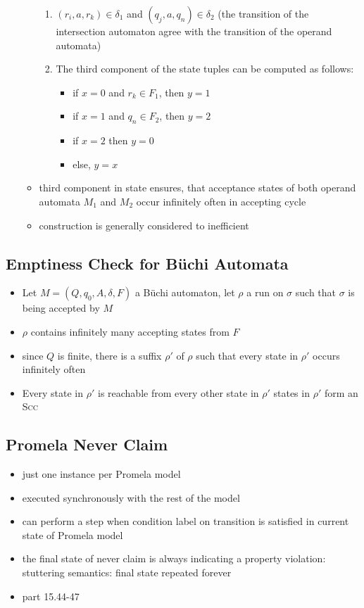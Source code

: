 \documentclass[a4paper, 10pt]{article}
\begin{document}
\begin{itemize}
\begin{itemize}
        \begin{enumerate}
            \item $(r_i,a,r_k)\in\delta_1$ and $(q_j,a,q_n)\in\delta_2$ (the transition of the intersection automaton agree with the transition of the operand automata)
            \item The third component of the state tuples can be computed as follows:
            \begin{itemize}
                \item if $x=0$ and $r_k\in F_1$, then $y=1$
                \item if $x=1$ and $q_n\in F_2$, then $y=2$
                \item if $x=2$ then $y=0$
                \item else, $y=x$
            \end{itemize}
        \end{enumerate}
        \item third component in state ensures, that acceptance states of both operand automata $M_1$ and $M_2$ occur infinitely often in accepting cycle
        \item construction is generally considered to inefficient
    \end{itemize}
\end{itemize}
\subsection*{Emptiness Check for Büchi Automata}
\begin{itemize}
    \item Let $M=(Q,q_0,A,\delta,F)$ a Büchi automaton, let $\rho$ a run on $\sigma$ such that $\sigma$ is being accepted by $M$
    \item $\rho$ contains infinitely many accepting states from $F$
    \item since $Q$ is finite, there is a suffix $\rho'$ of $\rho$ such that every state in $\rho'$ occurs infinitely often
    \item Every state in $\rho'$ is reachable from every other state in $\rho'$ \follows states in $\rho'$ form an \textsc{Scc}
\end{itemize}
\subsection*{Promela Never Claim}
\begin{itemize}
    \item just one instance per Promela model
    \item executed synchronously with the rest of the model
    \item can perform a step when condition label on transition is satisfied in current state of Promela model
    \item the final state of never claim is always indicating a property violation: stuttering semantics: final state repeated forever
    \item {} part 15.44-47
\end{itemize}
\end{document}
